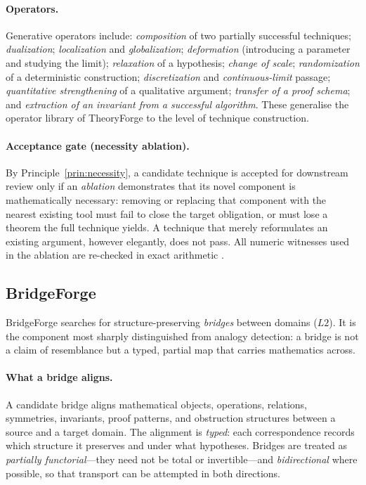 \documentclass[11pt]{article}
\theoremstyle{definition}
\theoremstyle{remark}
\begin{document}
\paragraph{Operators.} Generative operators include: \emph{composition} of two partially successful
techniques; \emph{dualization}; \emph{localization} and \emph{globalization}; \emph{deformation}
(introducing a parameter and studying the limit); \emph{relaxation} of a hypothesis; \emph{change of
scale}; \emph{randomization} of a deterministic construction; \emph{discretization} and
\emph{continuous-limit} passage; \emph{quantitative strengthening} of a qualitative argument;
\emph{transfer of a proof schema}; and \emph{extraction of an invariant from a successful
algorithm}. These generalise the operator library of TheoryForge \citep{lucius2026theoryforge} to
the level of technique construction.

\paragraph{Acceptance gate (necessity ablation).} By Principle~\ref{prin:necessity}, a candidate
technique is accepted for downstream review only if an \emph{ablation} demonstrates that its novel
component is mathematically necessary: removing or replacing that component with the nearest existing
tool must fail to close the target obligation, or must lose a theorem the full technique yields. A
technique that merely reformulates an existing argument, however elegantly, does not pass. All
numeric witnesses used in the ablation are re-checked in exact arithmetic
\citep{lucius2026bourbaki}.

\subsection{BridgeForge}
\label{sec:bridgeforge}

BridgeForge searches for structure-preserving \emph{bridges} between domains ($L2$). It is the
component most sharply distinguished from analogy detection: a bridge is not a claim of resemblance
but a typed, partial map that carries mathematics across.

\paragraph{What a bridge aligns.} A candidate bridge aligns mathematical objects, operations,
relations, symmetries, invariants, proof patterns, and obstruction structures between a source and a
target domain. The alignment is \emph{typed}: each correspondence records which structure it
preserves and under what hypotheses. Bridges are treated as \emph{partially functorial}---they need
not be total or invertible---and \emph{bidirectional} where possible, so that transport can be
attempted in both directions.
\end{document}
